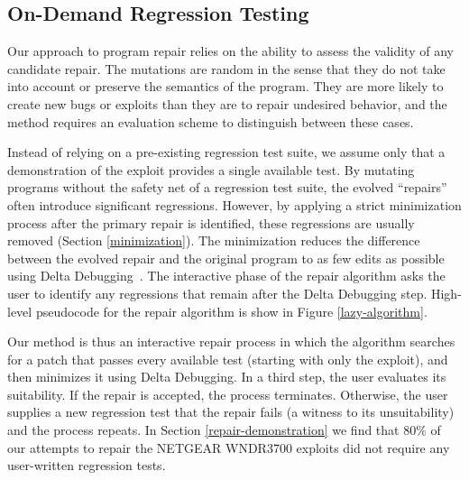 \documentclass{sigcomm-alternate}
\begin{document}
\subsection{On-Demand Regression Testing}
\label{on-demand-regression}

Our approach to program repair relies on the ability to
assess the validity of any candidate repair.  The mutations are random
in the sense that they do not take into account or preserve the
semantics of the program.  They are more likely to create new bugs
or exploits than they are to repair undesired behavior, and the method
requires an evaluation scheme to distinguish between these cases.

Instead of relying on a pre-existing regression test suite, we assume
only that a demonstration of the exploit provides a single available
test.  By mutating programs without the safety net of a regression
test suite, the evolved ``repairs'' often introduce significant
regressions.  However, by applying a strict minimization process after
the primary repair is identified, these regressions are usually
removed (Section \ref{minimization}).  The minimization reduces the
difference between the evolved repair and the original program to as
few edits as possible using Delta Debugging~\cite{delta}.  The
interactive phase of the repair algorithm asks the user to identify
any regressions that remain after the Delta Debugging step.
High-level pseudocode for the repair algorithm is show in Figure
\ref{lazy-algorithm}.

Our method is thus an interactive repair process in which the
algorithm searches for a patch that 
passes every available test (starting with only the exploit), and then
minimizes it using Delta Debugging.  In a third step,
the user evaluates its suitability.  If the repair is accepted, the process
terminates. Otherwise, the user supplies a new regression test that the repair
fails (a witness to its unsuitability) and the process repeats. 
In Section \ref{repair-demonstration} we find that 80\% of our
attempts to repair the NETGEAR WNDR3700 exploits did not require any
user-written regression tests.
\end{document}
